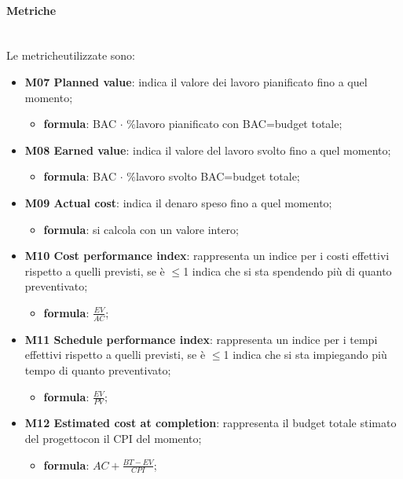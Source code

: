 			\paragraph*{Metriche}\mbox{}\\ [1mm]
			Le metriche\glosp utilizzate sono:
			\begin{itemize}		
				\item \textbf{M07 Planned value}: indica il valore dei lavoro pianificato fino a quel momento;
				\begin{itemize}
					\item[] \textbf{formula}: BAC $\cdot$ \%lavoro pianificato con BAC=budget totale;
				\end{itemize}
				
				\item \textbf{M08 Earned value}: indica il valore del lavoro svolto fino a quel momento;
				\begin{itemize}
					\item[] \textbf{formula}: BAC $\cdot$ \%lavoro svolto BAC=budget totale;
				\end{itemize} 
				
				\item \textbf{M09 Actual cost}: indica il denaro speso fino a quel momento; 
				\begin{itemize}
					\item[] \textbf{formula}: si calcola con un valore intero;
				\end{itemize}
				
				\item \textbf{M10 Cost performance index}: rappresenta un indice per i costi effettivi rispetto a quelli previsti, se è $\le$1 indica che si sta spendendo più di quanto preventivato;
				\begin{itemize}
					\item[] \textbf{formula}: $\frac{EV}{AC}$; 
				\end{itemize}
				
				\item \textbf{M11 Schedule performance index}: rappresenta un indice per i tempi effettivi rispetto a quelli previsti, se è $\le$1 indica che si sta impiegando più tempo di quanto preventivato;
				\begin{itemize}
					\item[] \textbf{formula}: $\frac{EV}{PV}$; 
				\end{itemize}
				
				\item \textbf{M12 Estimated cost at completion}: rappresenta il budget totale stimato del progetto\glosp con il CPI del momento;
				\begin{itemize}
					\item[] \textbf{formula}: $AC+\frac{BT-EV}{CPI}$; 
				\end{itemize} 
				

\end{itemize}
